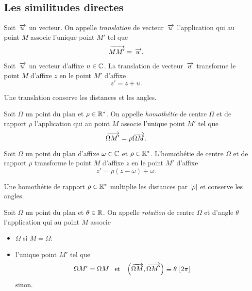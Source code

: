 \documentclass{magnoliaold}
\begin{document}
\subsection{Les similitudes directes}

\begin{definition}
Soit $\kern 2pt\overrightarrow{\kern -2ptu}$ un vecteur. On appelle \emph{translation} de vecteur $\kern 2pt\overrightarrow{\kern -2ptu}$ l'application qui au point $M$ associe l'unique point $M'$ tel que
\[\kern 2pt\overrightarrow{\kern -2ptMM'}=\kern 2pt\overrightarrow{\kern -2ptu}.\]
\end{definition}

\begin{proposition}
Soit $\kern 2pt\overrightarrow{\kern -2ptu}$ un vecteur d'affixe $u\in\mathbb{C}$. La translation de vecteur $\kern 2pt\overrightarrow{\kern -2ptu}$ transforme le point $M$ d'affixe $z$ en le point $M'$ d'affixe
\[z'=z+u.\]
\end{proposition}

\begin{remarqueUnique}
\remarque Une translation conserve les distances et les angles.
\end{remarqueUnique}

\begin{definition}
Soit $\Omega$ un point du plan et $\rho\in{\mathbb{R}^*}$. On appelle \emph{homothétie} de centre $\Omega$ et de rapport $\rho$ l'application qui au point $M$ associe l'unique point $M'$ tel que
\[\kern 2pt\overrightarrow{\kern -2pt\Omega M'}=\rho\kern 2pt\overrightarrow{\kern -2pt\Omega M}.\]
\end{definition}

\begin{proposition}
Soit $\Omega$ un point du plan d'affixe $\omega\in\mathbb{C}$ et $\rho\in{\mathbb{R}^*}$. L'homothétie de centre $\Omega$ et de rapport $\rho$ transforme le point $M$ d'affixe $z$ en le point $M'$ d'affixe
\[z'=\rho(z-\omega)+\omega.\]
\end{proposition}

\begin{remarqueUnique}
\remarque Une homothétie de rapport $\rho\in{\mathbb{R}^*}$ multiplie les distances par $\left|\rho\right|$
	et conserve les angles.
\end{remarqueUnique}

\begin{definition}
Soit $\Omega$ un point du plan et $\theta\in\mathbb{R}$. On appelle \emph{rotation} de centre $\Omega$ et d'angle $\theta$ l'application qui au point $M$ associe
\begin{itemize}
\item $\Omega$ si $M=\Omega$.
\item l'unique point $M'$ tel que
  \[\Omega M'=\Omega M \quad\!\text{et}\quad\! \left(\kern 2pt\overrightarrow{\kern -2pt\Omega M}, \kern 2pt\overrightarrow{\kern -2pt\Omega M'}\right)\equiv\theta\,\left[2\pi\right]\]
  sinon.
\end{itemize}
\end{definition}
\end{document}
